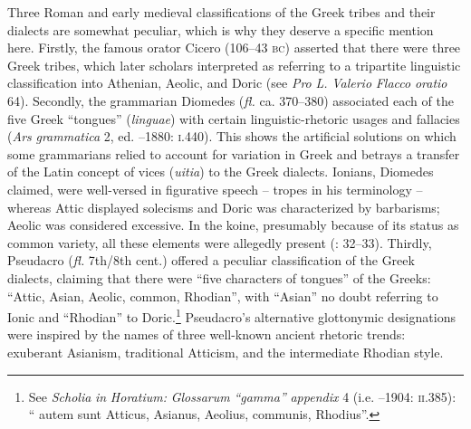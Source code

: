 \documentclass[output=paper]{langsci/langscibook}
\begin{document}
Three Roman and early medieval classifications of the Greek tribes and their dialects are somewhat peculiar, which is why they deserve a specific mention here. Firstly, the famous orator Cicero (106–43 \textsc{bc}) asserted that there were three Greek tribes, which later scholars interpreted as referring to a tripartite linguistic classification into Athenian, Aeolic, and Doric (see \textit{Pro} \textit{L.} \textit{Valerio} \textit{Flacco} \textit{oratio} 64). Secondly, the grammarian Diomedes (\textit{fl.} ca. 370–380) associated each of the five Greek “tongues” (\textit{linguae}) with certain linguistic-rhetoric usages and fallacies (\textit{Ars} \textit{grammatica} 2, ed. \citealt{Keil1855}–1880: \textsc{i}.440). This shows the artificial solutions on which some grammarians relied to account for variation in Greek and betrays a transfer of the Latin concept of vices (\textit{uitia}) to the Greek dialects. Ionians, Diomedes claimed, were well-versed in figurative speech – tropes in his terminology – whereas Attic displayed solecisms and Doric was characterized by barbarisms; Aeolic was considered excessive. In the koine, presumably because of its status as common variety, all these elements were allegedly present (\citealt{Consani1991}: 32–33). Thirdly, Pseudacro (\textit{fl.} 7th/8th cent.) offered a peculiar classification of the Greek dialects, claiming that there were “five characters of tongues” of the Greeks: “Attic, Asian, Aeolic, common, Rhodian”, with “Asian” no doubt referring to Ionic and “Rhodian” to Doric.\footnote{ \textrm{See} \textrm{\textit{Scholia} \textit{in} \textit{Horatium:} \textit{Glossarum} \textit{“gamma”} \textit{appendix}} \textrm{4 (i.e. \citealt{Pseudacro1902}–1904:} \textrm{\textsc{ii.}}\textrm{385): “} autem sunt  Atticus, Asianus, Aeolius, communis, Rhodius\textrm{”.}} Pseudacro’s alternative glottonymic designations were inspired by the names of three well-known ancient rhetoric trends: exuberant Asianism, traditional Atticism, and the intermediate Rhodian style.
\end{document}
